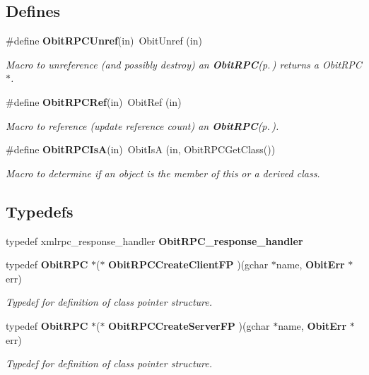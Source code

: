 \subsection*{Defines}
\begin{CompactItemize}
\item 
\#define {\bf Obit\-RPCUnref}(in)\ Obit\-Unref (in)
\begin{CompactList}\small\item\em Macro to unreference (and possibly destroy) an {\bf Obit\-RPC}{\rm (p.\,\pageref{structObitRPC})} returns a Obit\-RPC$\ast$. \item\end{CompactList}\item 
\#define {\bf Obit\-RPCRef}(in)\ Obit\-Ref (in)
\begin{CompactList}\small\item\em Macro to reference (update reference count) an {\bf Obit\-RPC}{\rm (p.\,\pageref{structObitRPC})}. \item\end{CompactList}\item 
\#define {\bf Obit\-RPCIs\-A}(in)\ Obit\-Is\-A (in, Obit\-RPCGet\-Class())
\begin{CompactList}\small\item\em Macro to determine if an object is the member of this or a derived class. \item\end{CompactList}\end{CompactItemize}
\subsection*{Typedefs}
\begin{CompactItemize}
\item 
typedef xmlrpc\_\-response\_\-handler {\bf Obit\-RPC\_\-response\_\-handler}
\item 
typedef {\bf Obit\-RPC} $\ast$($\ast$ {\bf Obit\-RPCCreate\-Client\-FP} )(gchar $\ast$name, {\bf Obit\-Err} $\ast$err)
\begin{CompactList}\small\item\em Typedef for definition of class pointer structure. \item\end{CompactList}\item 
typedef {\bf Obit\-RPC} $\ast$($\ast$ {\bf Obit\-RPCCreate\-Server\-FP} )(gchar $\ast$name, {\bf Obit\-Err} $\ast$err)
\begin{CompactList}\small\item\em Typedef for definition of class pointer structure. \item\end{CompactList}\end{CompactItemize}
